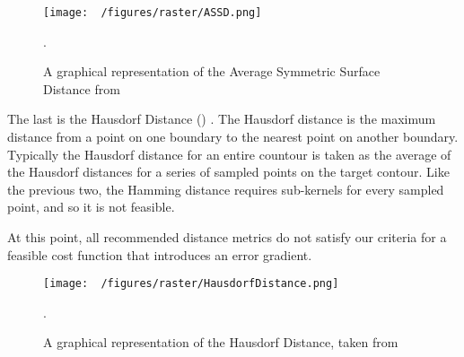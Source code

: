 \begin{figure}[h!]
  \centering
  \texttt{[image: ~/figures/raster/ASSD.png]}
  \caption{A graphical representation of the Average Symmetric Surface Distance from \cite{reinkeUnderstandingMetricrelatedPitfalls2023,reinkeCommonLimitationsImage2023}}.
  \label{fig:ASSD}
\end{figure}

The last is the Hausdorf Distance () \cite{huttenlocherMultiresolutionTechniqueComparing1993,felzenszwalbDistanceTransformsSampled2012,huttenlocherComparingImagesUsing1993}.
The Hausdorf distance is the maximum distance from a point on one boundary to the nearest point on another boundary. Typically the Hausdorf distance for an entire countour is taken as the average of the Hausdorf distances for a series of sampled points on the target contour.
Like the previous two, the Hamming distance requires sub-kernels for every sampled point, and so it is not feasible.

At this point, all recommended distance metrics do not satisfy our criteria for a feasible cost function that introduces an error gradient.

\begin{figure}[h!]
  \centering
  \texttt{[image: ~/figures/raster/HausdorfDistance.png]}
  \caption{A graphical representation of the Hausdorf Distance, taken from \cite{reinkeCommonLimitationsImage2023,reinkeUnderstandingMetricrelatedPitfalls2023}}.
  \label{fig:HD}
\end{figure}





